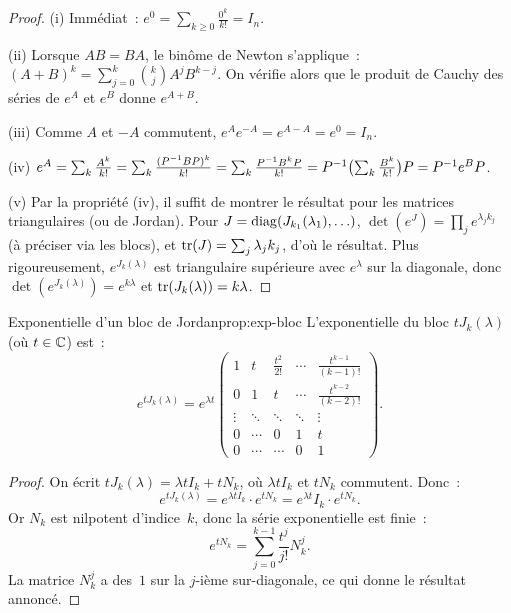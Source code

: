\begin{proof}
  (i) Immédiat~: $e^0=\sum_{k\geq 0}\frac{0^k}{k!}=I_n$.

  (ii) Lorsque $AB=BA$, le binôme de Newton s'applique~:
  $(A+B)^k=\sum_{j=0}^{k}\binom{k}{j}A^jB^{k-j}$. On vérifie alors
  que le produit de Cauchy des séries de $e^A$ et $e^B$ donne $e^{A+B}$.

  (iii) Comme $A$ et $-A$ commutent, $e^Ae^{-A}=e^{A-A}=e^0=I_n$.

  (iv) $e^A=\sum_k\frac{A^k}{k!}=\sum_k\frac{({P}^{-1}BP)^k}{k!}
  =\sum_k\frac{{P}^{-1}B^kP}{k!}={P}^{-1}\bigl(\sum_k\frac{B^k}{k!}\bigr)P
  ={P}^{-1}e^BP$.

  (v) Par la propriété (iv), il suffit de montrer le résultat pour les
  matrices triangulaires (ou de Jordan). Pour $J=\operatorname{diag}(J_{k_1}(\lambda_1),
  \ldots)$, $\det(e^J)=\prod_j e^{\lambda_j k_j}$ (à préciser via les
  blocs), et $\operatorname{tr}(J)=\sum_j\lambda_j k_j$, d'où le résultat. Plus
  rigoureusement, $e^{J_k(\lambda)}$ est triangulaire supérieure avec
  $e^\lambda$ sur la diagonale, donc $\det(e^{J_k(\lambda)})=e^{k\lambda}$
  et $\operatorname{tr}(J_k(\lambda))=k\lambda$.
\end{proof}

\begin{proposition}{Exponentielle d'un bloc de Jordan}{prop:exp-bloc}
  L'exponentielle du bloc $tJ_k(\lambda)$ (où $t\in{\mathbb{C}}$) est~:
  \[
    e^{tJ_k(\lambda)}=e^{\lambda t}
    \begin{pmatrix}
      1      & t      & \frac{t^2}{2!} & \cdots & \frac{t^{k-1}}{(k-1)!} \\
      0      & 1      & t              & \cdots & \frac{t^{k-2}}{(k-2)!} \\
      \vdots & \ddots & \ddots         & \ddots & \vdots \\
      0      & \cdots & 0              & 1      & t \\
      0      & \cdots & \cdots         & 0      & 1
    \end{pmatrix}.
  \]
\end{proposition}

\begin{proof}
  On écrit $tJ_k(\lambda)=\lambda t I_k+tN_k$, où $\lambda t I_k$ et
  $tN_k$ commutent. Donc~:
  \[
    e^{tJ_k(\lambda)}=e^{\lambda t I_k}\cdot e^{tN_k}
    =e^{\lambda t}I_k\cdot e^{tN_k}.
  \]
  Or $N_k$ est nilpotent d'indice~$k$, donc la série exponentielle est
  finie~:
  \[
    e^{tN_k}=\sum_{j=0}^{k-1}\frac{t^j}{j!}N_k^j.
  \]
  La matrice $N_k^j$ a des~$1$ sur la $j$-ième sur-diagonale, ce qui
  donne le résultat annoncé.
\end{proof}

